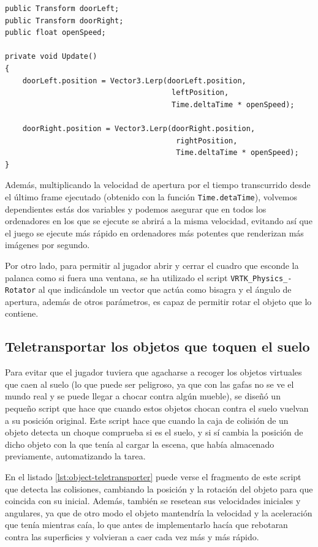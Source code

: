 \begin{lstlisting}[caption=Fragmento del script para abrir y cerrar una puerta abatible con una palanca, label=lst:lever-controller]
public Transform doorLeft;
public Transform doorRight;
public float openSpeed;

private void Update()
{
    doorLeft.position = Vector3.Lerp(doorLeft.position,
                                      leftPosition,
                                      Time.deltaTime * openSpeed);
    
    doorRight.position = Vector3.Lerp(doorRight.position,
                                       rightPosition,
                                       Time.deltaTime * openSpeed);
}
\end{lstlisting}

Además, multiplicando la velocidad de apertura por el tiempo transcurrido desde el último frame ejecutado (obtenido con la función \texttt{Time.detaTime}), volvemos dependientes estás dos variables y podemos asegurar que en todos los ordenadores en los que se ejecute se abrirá a la misma velocidad, evitando así que el juego se ejecute más rápido en ordenadores más potentes que renderizan más imágenes por segundo.

Por otro lado, para permitir al jugador abrir y cerrar el cuadro que esconde la palanca como si fuera una ventana, se ha utilizado el script \texttt{VRTK\_Physics\_-} \texttt{Rotator} al que indicándole un vector que actúa como bisagra y el ángulo de apertura, además de otros parámetros, es capaz de permitir rotar el objeto que lo contiene.

\subsection{Teletransportar los objetos que toquen el suelo}

Para evitar que el jugador tuviera que agacharse a recoger los objetos virtuales que caen al suelo (lo que puede ser peligroso, ya que con las gafas no se ve el mundo real y se puede llegar a chocar contra algún mueble), se diseñó un pequeño script que hace que cuando estos objetos chocan contra el suelo vuelvan a su posición original. Este script hace que cuando la caja de colisión de un objeto detecta un choque comprueba si es el suelo, y si sí cambia la posición de dicho objeto con la que tenía al cargar la escena, que había almacenado previamente, automatizando la tarea.

En el listado \ref{lst:object-teletransporter} puede verse el fragmento de este script que detecta las colisiones, cambiando la posición y la rotación del objeto para que coincida con su inicial. Además, también se resetean sus velocidades iniciales y angulares, ya que de otro modo el objeto mantendría la velocidad y la aceleración que tenía mientras caía, lo que antes de implementarlo hacía que rebotaran contra las superficies y volvieran a caer cada vez más y más rápido.

